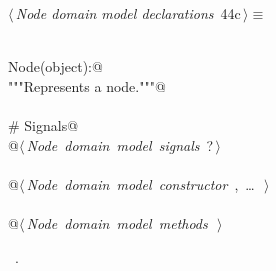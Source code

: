 \documentclass[
    a4paper,      %
    10pt,         %
    openright,    %
    notitlepage,  %
    parskip=half, %
]{scrreprt}       %
\theoremstyle{definition}                    %
\begin{document}
\begin{flushleft} \small
\begin{minipage}{\linewidth}\label{scrap57}\raggedright\small
{} $\langle\,${\itshape Node domain model declarations}\nobreak\ {\footnotesize {44c}}$\,\rangle\equiv$
\vspace{-1exm}
\begin{list}{}{} \item
\mbox{}\lstinline@@\\
\mbox{}\lstinline@class Node(object):@\\
\mbox{}\lstinline@    """Represents a node."""@\\
\mbox{}\lstinline@@\\
\mbox{}\lstinline@    # Signals@\\
\mbox{}\lstinline@    @\hbox{$\langle\,${\itshape Node domain model signals}\nobreak\ {\footnotesize ?}$\,\rangle$}\lstinline@@\\
\mbox{}\lstinline@@\\
\mbox{}\lstinline@    @\hbox{$\langle\,${\itshape Node domain model constructor}\nobreak\ {\footnotesize {}, \ldots\ }$\,\rangle$}\lstinline@@\\
\mbox{}\lstinline@@\\
\mbox{}\lstinline@    @\hbox{$\langle\,${\itshape Node domain model methods}\nobreak\ {\footnotesize {}}$\,\rangle$}\lstinline@@\\
\mbox{}\lstinline@@{\NWsep}
\end{list}
\vspace{-1.5ex}
\footnotesize
\begin{list}{}{\setlength{\itemsep}{-\parsep}\setlength{\itemindent}{-\leftmargin}}
\item \NWtxtMacroRefIn\ .

\item{}
\end{list}
\end{minipage}\vspace{4ex}
\end{flushleft}
\end{document}
